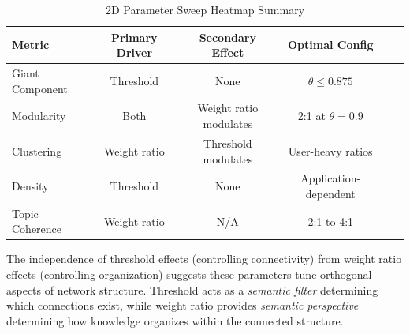 \begin{table}[h]
\centering
\caption{2D Parameter Sweep Heatmap Summary}
\label{tab:2d_summary}
\begin{tabular}{lccccc}
\toprule
\textbf{Metric} & \textbf{Primary Driver} & \textbf{Secondary Effect} & \textbf{Optimal Config} \\
\midrule
Giant Component & Threshold & None & $\theta \leq 0.875$ \\
Modularity & Both & Weight ratio modulates & 2:1 at $\theta=0.9$ \\
Clustering & Weight ratio & Threshold modulates & User-heavy ratios \\
Density & Threshold & None & Application-dependent \\
Topic Coherence & Weight ratio & N/A & 2:1 to 4:1 \\
\bottomrule
\end{tabular}
\end{table}

The independence of threshold effects (controlling connectivity) from weight ratio effects (controlling organization) suggests these parameters tune orthogonal aspects of network structure. Threshold acts as a \emph{semantic filter} determining which connections exist, while weight ratio provides \emph{semantic perspective} determining how knowledge organizes within the connected structure.